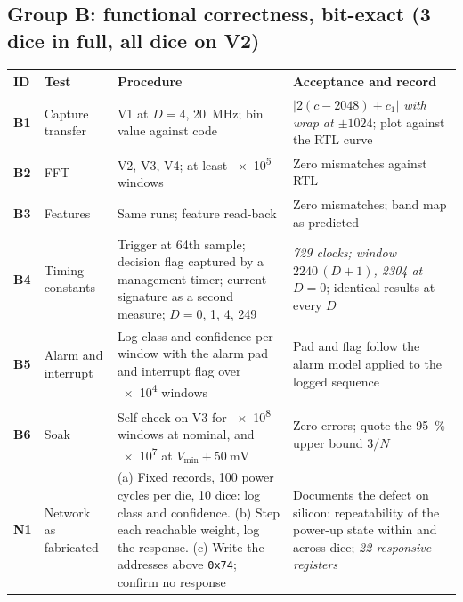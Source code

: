 \documentclass[10pt]{article}
\newcommand{\tid}[1]{\textbf{#1}}
\newcommand{\pred}[1]{\textit{#1}}
\begin{document}
\subsection*{Group B: functional correctness, bit-exact \normalfont(3 dice in full, all dice on V2)}
{\small
\begin{longtable}{@{}L{0.8cm}L{3.3cm}L{6.6cm}L{4.3cm}@{}}
\toprule
ID & Test & Procedure & Acceptance and record\\
\midrule
\endhead
\tid{B1} & Capture transfer & V1 at $D=4$, \SI{20}{\mega\hertz}; bin value against code & \pred{$|2(c-2048)+c_1|$ with wrap at $\pm1024$}; plot against the RTL curve\\
\tid{B2} & FFT & V2, V3, V4; at least \num{e5} windows & Zero mismatches against RTL\\
\tid{B3} & Features & Same runs; feature read-back & Zero mismatches; band map as predicted\\
\tid{B4} & Timing constants & Trigger at 64th sample; decision flag captured by a management timer; current signature as a second measure; $D=0$, 1, 4, 249 & \pred{729 clocks; window $2240\,(D+1)$, \num{2304} at $D=0$}; identical results at every $D$\\
\tid{B5} & Alarm and interrupt & Log class and confidence per window with the alarm pad and interrupt flag over \num{e4} windows & Pad and flag follow the alarm model applied to the logged sequence\\
\tid{B6} & Soak & Self-check on V3 for \num{e8} windows at nominal, and \num{e7} at $V_{\min}+\SI{50}{\milli\volt}$ & Zero errors; quote the \SI{95}{\percent} upper bound $3/N$\\
\tid{N1} & Network as fabricated & (a) Fixed records, 100 power cycles per die, 10 dice: log class and confidence. (b) Step each reachable weight, log the response. (c) Write the addresses above \texttt{0x74}; confirm no response & Documents the defect on silicon: repeatability of the power-up state within and across dice; \pred{22 responsive registers}\\
\bottomrule
\end{longtable}}
\end{document}
